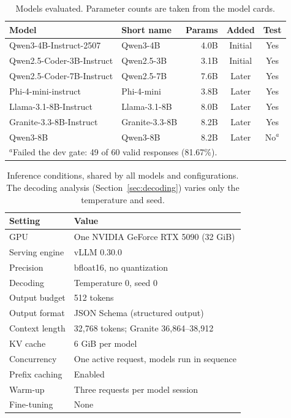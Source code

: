 \documentclass[a4paper,fleqn]{cas-dc}
\begin{document}
\begin{table}[t]
\centering\small
\caption{Models evaluated. Parameter counts are taken from the model cards.}
\label{tab:models}
\begin{tabular}{llrcc}
\toprule
Model & Short name & Params & Added & Test \\
\midrule
Qwen3-4B-Instruct-2507 \citep{yang2025qwen3} & Qwen3-4B & 4.0B & Initial & Yes \\
Qwen2.5-Coder-3B-Instruct \citep{hui2024qwen25coder} & Qwen2.5-3B & 3.1B & Initial & Yes \\
Qwen2.5-Coder-7B-Instruct \citep{hui2024qwen25coder} & Qwen2.5-7B & 7.6B & Later & Yes \\
Phi-4-mini-instruct \citep{microsoft2025phi4mini} & Phi-4-mini & 3.8B & Later & Yes \\
Llama-3.1-8B-Instruct \citep{grattafiori2024llama3} & Llama-3.1-8B & 8.0B & Later & Yes \\
Granite-3.3-8B-Instruct \citep{ibm2025granite33} & Granite-3.3-8B & 8.2B & Later & Yes \\
Qwen3-8B \citep{yang2025qwen3} & Qwen3-8B & 8.2B & Later & No$^{a}$ \\
\bottomrule
\multicolumn{5}{l}{\footnotesize $^{a}$Failed the dev gate: 49 of 60 valid responses (81.67\%).}
\end{tabular}
\end{table}

\begin{table}[t]
\centering\small
\caption{Inference conditions, shared by all models and configurations. The
decoding analysis (Section~\ref{sec:decoding}) varies only the temperature and
seed.}
\label{tab:inference}
\begin{tabular}{ll}
\toprule
Setting & Value \\
\midrule
GPU & One NVIDIA GeForce RTX 5090 (32 GiB) \\
Serving engine & vLLM 0.30.0 \citep{kwon2023vllm} \\
Precision & bfloat16, no quantization \\
Decoding & Temperature 0, seed 0 \\
Output budget & 512 tokens \\
Output format & JSON Schema (structured output) \\
Context length & 32,768 tokens; Granite 36,864--38,912 \\
KV cache & 6 GiB per model \\
Concurrency & One active request, models run in sequence \\
Prefix caching & Enabled \\
Warm-up & Three requests per model session \\
Fine-tuning & None \\
\bottomrule
\end{tabular}
\end{table}
\end{document}
